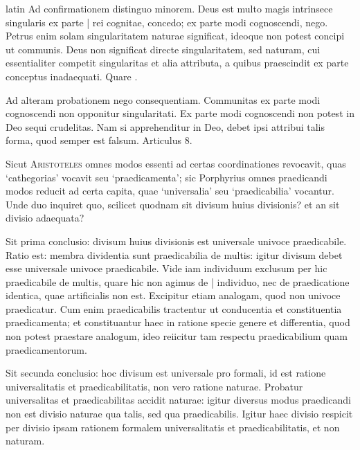 \begin{otherlanguage*}{latin}
\pstart
Ad confirmationem distinguo minorem. Deus est multo magis intrinsece singularis ex parte \textnormal{|} rei cognitae, concedo; ex parte modi cognoscendi, nego. Petrus enim solam singularitatem naturae significat, ideoque non potest concipi ut communis. Deus non significat directe singularitatem, sed naturam, cui essentialiter competit singularitas et alia attributa, a quibus praescindit ex parte conceptus inadaequati. Quare . 
\pend

\pstart
Ad alteram probationem nego consequentiam. Communitas ex parte modi cognoscendi non opponitur singularitati. Ex parte modi cognoscendi non potest in Deo sequi crudelitas. Nam si apprehenditur in Deo, debet ipsi attribui talis forma, quod semper est falsum. Articulus 8. 
\pend

\pstart
{}
\pend

\pstart
Sicut \textsc{Aristoteles} omnes modos essenti ad certas coordinationes revocavit, quas `cathegorias' vocavit seu `praedicamenta'; sic Porphyrius omnes praedicandi modos reducit ad certa capita, quae `universalia' seu `praedicabilia' vocantur. Unde duo inquiret quo, scilicet quodnam sit divisum huius divisionis? et an sit divisio adaequata? 
\pend

\pstart
Sit prima conclusio:
divisum huius divisionis est universale univoce praedicabile. Ratio est:
membra dividentia sunt praedicabilia de multis:
igitur divisum debet esse universale univoce praedicabile. Vide iam individuum exclusum per hic praedicabile de multis, quare hic non agimus de \textnormal{|} individuo, nec de praedicatione identica, quae artificialis non est. Excipitur etiam analogam, quod non univoce praedicatur. Cum enim praedicabilis tractentur ut conducentia et constituentia praedicamenta; et constituantur haec in ratione specie genere et differentia, quod non potest praestare analogum, ideo reiicitur tam respectu praedicabilium quam praedicamentorum. 
\pend

\pstart
Sit secunda conclusio:
hoc divisum est universale pro formali, id est ratione universalitatis et praedicabilitatis, non vero ratione naturae. Probatur universalitas et praedicabilitas accidit naturae:
igitur diversus modus praedicandi non est divisio naturae qua talis, sed qua praedicabilis. Igitur haec divisio respicit per divisio ipsam rationem formalem universalitatis et praedicabilitatis, et non naturam. 
\pend


\end{otherlanguage*}
